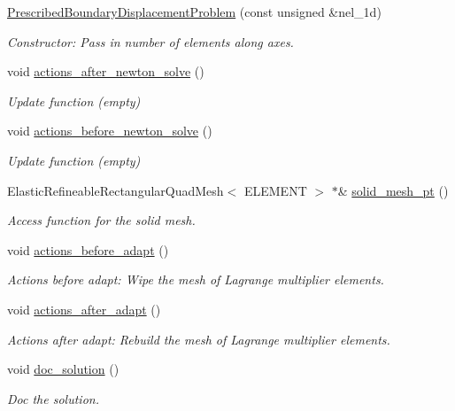 \begin{DoxyCompactItemize}
\hyperlink{classPrescribedBoundaryDisplacementProblem_a7b5c8949e774e0ac46ddc6481e9d96df}{Prescribed\+Boundary\+Displacement\+Problem} (const unsigned \&nel\+\_\+1d)
\begin{DoxyCompactList}\small\item\em Constructor\+: Pass in number of elements along axes. \end{DoxyCompactList}\item 
void \hyperlink{classPrescribedBoundaryDisplacementProblem_a53e7d18d9d748388160d6c4106f1d493}{actions\+\_\+after\+\_\+newton\+\_\+solve} ()
\begin{DoxyCompactList}\small\item\em Update function (empty) \end{DoxyCompactList}\item 
void \hyperlink{classPrescribedBoundaryDisplacementProblem_ad2184bb8d7391da21bec62d4aacf5c20}{actions\+\_\+before\+\_\+newton\+\_\+solve} ()
\begin{DoxyCompactList}\small\item\em Update function (empty) \end{DoxyCompactList}\item 
Elastic\+Refineable\+Rectangular\+Quad\+Mesh$<$ E\+L\+E\+M\+E\+NT $>$ $\ast$\& \hyperlink{classPrescribedBoundaryDisplacementProblem_ac0fc3028f61cec5ac4b01670d7728934}{solid\+\_\+mesh\+\_\+pt} ()
\begin{DoxyCompactList}\small\item\em Access function for the solid mesh. \end{DoxyCompactList}\item 
void \hyperlink{classPrescribedBoundaryDisplacementProblem_a2e9f335e8680b0f2338b579e37e9d38a}{actions\+\_\+before\+\_\+adapt} ()
\begin{DoxyCompactList}\small\item\em Actions before adapt\+: Wipe the mesh of Lagrange multiplier elements. \end{DoxyCompactList}\item 
void \hyperlink{classPrescribedBoundaryDisplacementProblem_aae7225db18ad5c8429c0eb96fa37b585}{actions\+\_\+after\+\_\+adapt} ()
\begin{DoxyCompactList}\small\item\em Actions after adapt\+: Rebuild the mesh of Lagrange multiplier elements. \end{DoxyCompactList}\item 
void \hyperlink{classPrescribedBoundaryDisplacementProblem_abc58821d6b49cd9773dcd90b240aab6e}{doc\+\_\+solution} ()
\begin{DoxyCompactList}\small\item\em Doc the solution. \end{DoxyCompactList}\end{DoxyCompactItemize}
